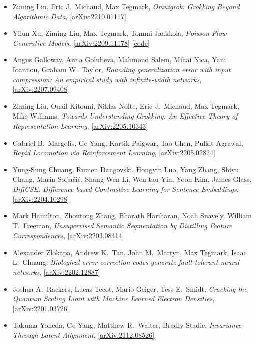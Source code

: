 \begin{itemize}
\item Ziming Liu, Eric J.\  Michaud, Max Tegmark, \textit{Omnigrok: Grokking Beyond Algorithmic Data}, \href{https://arxiv.org/abs/2210.01117}{[arXiv:2210.01117]} 
\item Yilun Xu, Ziming Liu, Max Tegmark, Tommi Jaakkola, \textit{Poisson Flow Generative Models}, \href{https://arxiv.org/abs/2209.11178}{[arXiv:2209.11178]}  \href{https://github.com/Newbeeer/poisson_flow}{[code]} 
\item Angus Galloway, Anna Golubeva, Mahmoud Salem, Mihai Nica, Yani Ioannou, Graham W.\  Taylor, \textit{Bounding generalization error with input compression: An empirical study with infinite-width networks}, \href{https://arxiv.org/abs/2207.09408}{[arXiv:2207.09408]} 
\item Ziming Liu, Ouail Kitouni, Niklas Nolte, Eric J.\  Michaud, Max Tegmark, Mike Williams, \textit{Towards Understanding Grokking: An Effective Theory of Representation Learning}, \href{https://arxiv.org/abs/2205.10343}{[arXiv:2205.10343]} 
\item Gabriel B.\  Margolis, Ge Yang, Kartik Paigwar, Tao Chen, Pulkit Agrawal, \textit{Rapid Locomotion via Reinforcement Learning}, \href{https://arxiv.org/abs/2205.02824}{[arXiv:2205.02824]} 
\item Yung-Sung Chuang, Rumen Dangovski, Hongyin Luo, Yang Zhang, Shiyu Chang, Marin Soljačić, Shang-Wen Li, Wen-tau Yin, Yoon Kim, James Glass, \textit{DiffCSE: Difference-based Contrastive Learning for Sentence Embeddings}, \href{https://arxiv.org/abs/2204.10298}{[arXiv:2204.10298]} 
\item Mark Hamilton, Zhoutong Zhang, Bharath Hariharan, Noah Snavely, William T.\  Freeman, \textit{Unsupervised Semantic Segmentation by Distilling Feature Correspondences}, \href{https://arxiv.org/abs/2203.08414}{[arXiv:2203.08414]} 
\item Alexander Zlokapa, Andrew K.\  Tan, John M.\  Martyn, Max Tegmark, Isaac L.\  Chuang, \textit{Biological error correction codes generate fault-tolerant neural networks}, \href{https://arxiv.org/abs/2202.12887}{[arXiv:2202.12887]} 
\item Joshua A.\  Rackers, Lucas Tecot, Mario Geiger, Tess E.\  Smidt, \textit{Cracking the Quantum Scaling Limit with Machine Learned Electron Densities}, \href{https://arxiv.org/abs/2201.03726}{[arXiv:2201.03726]} 
\item Takuma Yoneda, Ge Yang, Matthew R.\  Walter, Bradly Stadie, \textit{Invariance Through Latent Alignment}, \href{https://arxiv.org/abs/2112.08526}{[arXiv:2112.08526]} 

\end{itemize}
